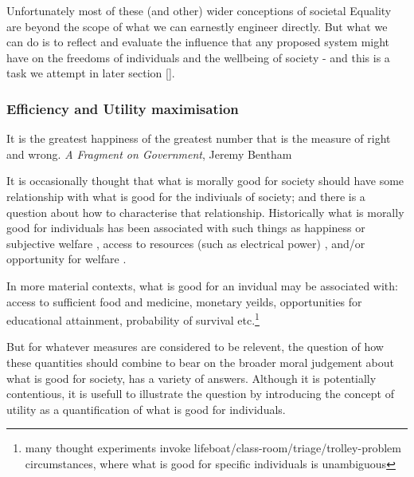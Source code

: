 Unfortunately most of these (and other) wider conceptions of societal Equality are beyond the scope of what we can earnestly engineer directly. But what we can do is to reflect and evaluate the influence that any proposed system might have on the freedoms of individuals and the wellbeing of society - and this is a task we attempt in later section \ref{}.

\subsubsection{Efficiency and Utility maximisation}\label{sec:philosophy_efficiency}


\begin{displayquote}It is the greatest happiness of the greatest number that is the measure of right and wrong. \textit{A Fragment on Government}, Jeremy Bentham\cite{bentham2001fragment}
\end{displayquote} 

It is occasionally thought that what is morally good for society should have some relationship with what is good for the indiviuals of society; and there is a question about how to characterise that relationship.
Historically what is morally good for individuals has been associated with such things as happiness \cite{burns2005happiness} or subjective welfare \cite{10.2307/2264894}, access to resources (such as electrical power) \cite{10.2307/2265047}, and/or opportunity for welfare \cite{10.2307/4320203}.%

In more material contexts, what is good for an invidual may be associated with: access to sufficient food and medicine, monetary yeilds, opportunities for educational attainment, probability of survival etc.\footnote{many thought experiments invoke lifeboat/class-room/triage/trolley-problem circumstances, where what is good for specific individuals is unambiguous}

But for whatever measures are considered to be relevent, the question of how these quantities should combine to bear on the broader moral judgement about what is good for society, has a variety of answers.
Although it is potentially contentious, it is usefull to illustrate the question by introducing the concept of utility as a quantification of what is good for individuals.

